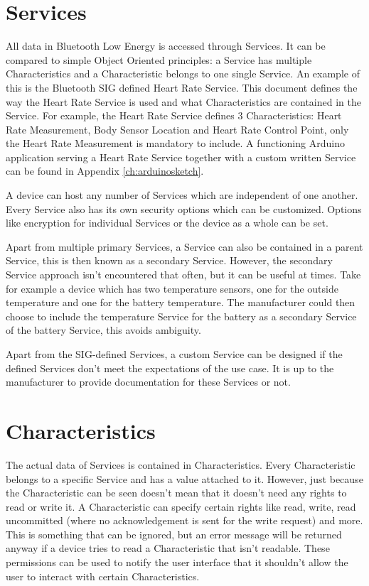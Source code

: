 \documentclass[pdftex,a4paper,12pt,twoside]{report}
\begin{document}
\section{Services}
\label{sec:services}
All data in Bluetooth Low Energy is accessed through Services. It can be compared to simple Object Oriented principles: a Service has multiple Characteristics and a Characteristic belongs to one single Service. An example of this is the Bluetooth SIG defined Heart Rate Service. This document defines the way the Heart Rate Service is used and what Characteristics are contained in the Service. For example, the Heart Rate Service defines 3 Characteristics: Heart Rate Measurement, Body Sensor Location and Heart Rate Control Point, only the Heart Rate Measurement is mandatory to include. A functioning Arduino application serving a Heart Rate Service together with a custom written Service can be found in Appendix \ref{ch:arduinosketch}.

A device can host any number of Services which are independent of one another. Every Service also has its own security options which can be customized. Options like encryption for individual Services or the device as a whole can be set.

Apart from multiple primary Services, a Service can also be contained in a parent Service, this is then known as a secondary Service. However, the secondary Service approach isn't encountered that often, but it can be useful at times. Take for example a device which has two temperature sensors, one for the outside temperature and one for the battery temperature. The manufacturer could then choose to include the temperature Service for the battery as a secondary Service of the battery Service, this avoids ambiguity.

Apart from the SIG-defined Services, a custom Service can be designed if the defined Services don't meet the expectations of the use case. It is up to the manufacturer to provide documentation for these Services or not.

\section{Characteristics}
\label{sec:characteristics}
The actual data of Services is contained in Characteristics. Every Characteristic belongs to a specific Service and has a value attached to it. However, just because the Characteristic can be seen doesn't mean that it doesn't need any rights to read or write it. A Characteristic can specify certain rights like read, write, read uncommitted (where no acknowledgement is sent for the write request) and more. This is something that can be ignored, but an error message will be returned anyway if a device tries to read a Characteristic that isn't readable. These permissions can be used to notify the user interface that it shouldn't allow the user to interact with certain Characteristics.
\end{document}
